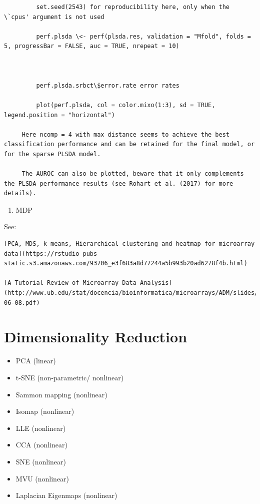 \documentclass[
]{book}
\providecommand{\tightlist}{%
  \setlength{\itemsep}{0pt}\setlength{\parskip}{0pt}}
\begin{document}
\begin{enumerate}
\begin{verbatim}
         set.seed(2543) for reproducibility here, only when the \`cpus' argument is not used

         perf.plsda \<- perf(plsda.res, validation = "Mfold", folds = 5, progressBar = FALSE, auc = TRUE, nrepeat = 10)



         perf.plsda.srbct\$error.rate error rates

         plot(perf.plsda, col = color.mixo(1:3), sd = TRUE, legend.position = "horizontal")

     Here ncomp = 4 with max distance seems to achieve the best classification performance and can be retained for the final model, or for the sparse PLSDA model.

     The AUROC can also be plotted, beware that it only complements the PLSDA performance results (see Rohart et al. (2017) for more details).
\end{verbatim}

  \begin{enumerate}
  \def\labelenumii{\arabic{enumii}.}
  \setcounter{enumii}{8}
  \tightlist
  \item
    MDP
  \end{enumerate}
\end{enumerate}

See:

\begin{verbatim}
[PCA, MDS, k-means, Hierarchical clustering and heatmap for microarray data](https://rstudio-pubs-static.s3.amazonaws.com/93706_e3f683a8d77244a5b993b20ad6278f4b.html)

[A Tutorial Review of Microarray Data Analysis](http://www.ub.edu/stat/docencia/bioinformatica/microarrays/ADM/slides/A_Tutorial_Review_of_Microarray_data_Analysis_17-06-08.pdf)
\end{verbatim}

\hypertarget{dimensionality-reduction}{%
\section{Dimensionality Reduction}\label{dimensionality-reduction}}

\begin{itemize}
\item
  PCA (linear)
\item
  t-SNE (non-parametric/ nonlinear)
\item
  Sammon mapping (nonlinear)
\item
  Isomap (nonlinear)
\item
  LLE (nonlinear)
\item
  CCA (nonlinear)
\item
  SNE (nonlinear)
\item
  MVU (nonlinear)
\item
  Laplacian Eigenmaps (nonlinear)
\end{itemize}
\end{document}
